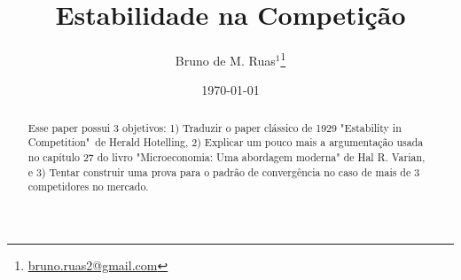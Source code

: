 \documentclass[a4paper]{article}
\title{Estabilidade na Competição}
\author{Bruno de M. Ruas$^1$\thanks{\href{mailto://bruno.ruas2@gmail.com}{bruno.ruas2@gmail.com}}}
\date{\today}
\theoremstyle{plain}
\theoremstyle{definition}
\begin{document}
\maketitle
	
\begin{abstract}

Esse paper possui 3 objetivos: 1) Traduzir o paper clássico de 1929 "Estability in Competition"\ de Herald Hotelling, 2) Explicar um pouco mais a argumentação usada no capítulo 27 do livro "Microeconomia: Uma abordagem moderna" de Hal R. Varian, e 3) Tentar construir uma prova para o padrão de convergência no caso de mais de 3 competidores no mercado.
\end{abstract}


\tableofcontents
	
\end{document}
